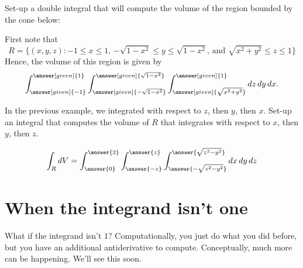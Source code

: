 \documentclass{ximera}
\begin{document}
\begin{example}
  Set-up a double integral that will compute the volume of the region
  bounded by the cone below:
  \begin{image}
  \end{image}
  \begin{explanation}
    First note that 
    \[
    R=\{(x,y,z):\text{$-1\leq x\leq 1$, $-\sqrt{1-x^2}\leq y\leq \sqrt{1-x^2}$, and $\sqrt{x^2+y^2}\leq z \leq 1$}\}
    \]
    Hence, the volume of this region is given by
    \[
    \int_{\answer[given]{-1}}^{\answer[given]{1}} \int_{\answer[given]{-\sqrt{1-x^2}}}^{\answer[given]{\sqrt{1-x^2}}} \int_{\answer[given]{\sqrt{x^2+y^2}}}^{\answer[given]{1}}\d z \d y\d x.
    \]
    \end{explanation}
\end{example}

\begin{question}
  In the previous example, we integrated with respect to $z$, then
  $y$, then $x$. Set-up an integral that computes the volume of $R$
  that integrates with respect to $x$, then $y$, then $z$.
  \begin{prompt}
    \[
    \int_R \d V = \int_{\answer{0}}^{\answer{2}}\int_{\answer{-z}}^{\answer{z}} \int_{\answer{-\sqrt{z^2-y^2}}}^{\answer{\sqrt{z^2-y^2}}} \d x \d y \d z
    \]
  \end{prompt}
\end{question}

\section{When the integrand isn't one}

What if the integrand isn't $1$? Computationally, you just do what you
did before, but you have an additional antiderivative to
compute. Conceptually, much more can be happening. We'll see this soon.
\end{document}
